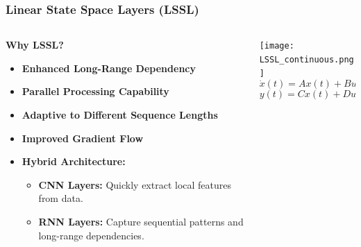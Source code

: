\documentclass{beamer}
\begin{document}
\begin{frame}
    \frametitle{Linear State Space Layers (LSSL)}
    \begin{columns}[T]
        \begin{column}{0.55\textwidth}
            \vspace{3mm}
            \textbf{Why LSSL?}
            \begin{itemize}
                \item \textbf{Enhanced Long-Range Dependency}
                \item \textbf{Parallel Processing Capability}
                \item \textbf{Adaptive to Different Sequence Lengths}
                \item \textbf{Improved Gradient Flow}
                \item \textbf{Hybrid Architecture:}
                \begin{itemize}
                    \item \textbf{CNN Layers:} Quickly extract local features from data.
                    \item \textbf{RNN Layers:} Capture sequential patterns and long-range dependencies.
                \end{itemize}
            \end{itemize}
        \end{column}
        
        \begin{column}{0.40\textwidth}
            \begin{center}
                \vspace{-6mm}
                \texttt{[image: LSSL\_continuous.png]} %
                \vspace{-4mm} %
                {\small
                \[
                  \dot{x}(t) = Ax(t) + Bu(t)
                \]
                \vspace{-7mm} %
                \[
                  y(t) = Cx(t) + Du(t)
                \]
                }
            \end{center}
        \end{column}
    \end{columns}
\end{frame}
\end{document}
